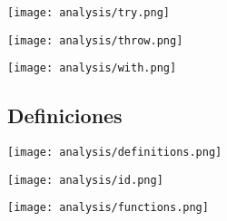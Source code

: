 \begin{multicols}{2}
\begin{center}
\texttt{[image: analysis/try.png]} 
\end{center}
\columnbreak
\begin{center}
\texttt{[image: analysis/throw.png]} 
\end{center}
\end{multicols}

\begin{center}
\texttt{[image: analysis/with.png]} 
\end{center}
\subsection {Definiciones}
\begin{center}
\texttt{[image: analysis/definitions.png]} 
\end{center}

\begin{center}
\texttt{[image: analysis/id.png]} 
\end{center}

\begin{center}
\texttt{[image: analysis/functions.png]} 
\end{center}

